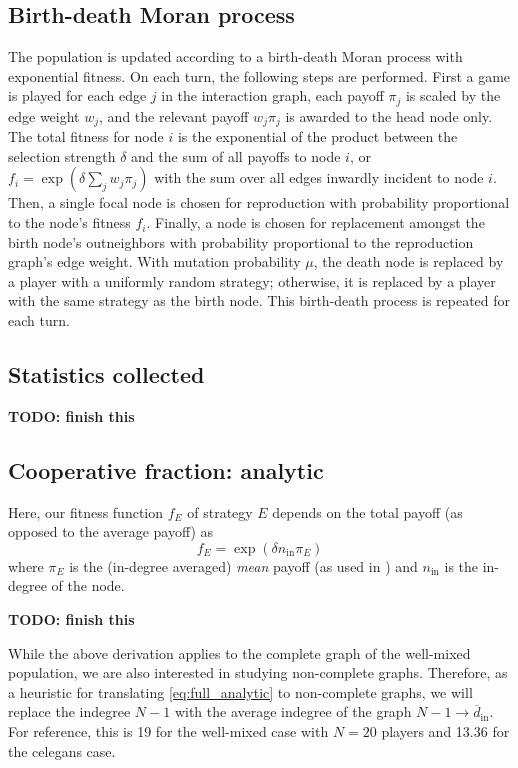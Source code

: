 \documentclass[pdflatex,lineno,referee,sn-mathphys-ay]{sn-jnl}
\begin{document}
\subsection{Birth-death Moran process}
\label{sec:evo_setup}
The population is updated according to a birth-death Moran process
with exponential fitness.
On each turn, the following steps are performed.
First a game is played for each edge $j$ in the interaction graph,
each payoff $\pi_j$ is scaled by the edge weight $w_j$,
and the relevant payoff $w_j \pi_j$ is awarded to the head node only.
The total fitness for node $i$ is the exponential of the product
between the selection strength $\delta$
and the sum of all payoffs to node $i$,
or $f_i = \exp(\delta \sum_j w_j \pi_j)$ with the sum
over all edges inwardly incident to node $i$.
Then, a single focal node is chosen for reproduction
with probability proportional to the node's fitness $f_i$.
Finally, a node is chosen for replacement amongst the birth node's outneighbors
with probability proportional to the reproduction graph's edge weight.
With mutation probability $\mu$,
the death node is replaced by a player with a uniformly random strategy;
otherwise, it is replaced by a player with the same strategy as the birth node.
This birth-death process is repeated for each turn.

\subsection{Statistics collected}
\label{sec:stats_setup}
\textbf{TODO: finish this}

\subsection{Cooperative fraction: analytic}
\label{sec:analytic}
Here, our fitness function $f_E$ of strategy $E$ depends
on the total payoff (as opposed to the average payoff) as
\begin{equation}
  f_E = \exp(\delta n_{\text{in}} \pi_E)
\end{equation}
where $\pi_E$ is the (in-degree averaged) \emph{mean} payoff
(as used in \cite{tripp2022evolutionary})
and $n_{\text{in}}$ is the in-degree of the node.

\textbf{TODO: finish this}

While the above derivation applies to the complete graph
of the well-mixed population,
we are also interested in studying non-complete graphs.
Therefore, as a heuristic for translating \cref{eq:full_analytic}
to non-complete graphs,
we will replace the indegree $N-1$ with the average indegree of the graph
$N-1 \to \overline{d}_{\text{in}}$.
For reference, this is \num{19} for the well-mixed case with $N=20$ players
and \num{13.36} for the \gls{celegans} case.
\end{document}
